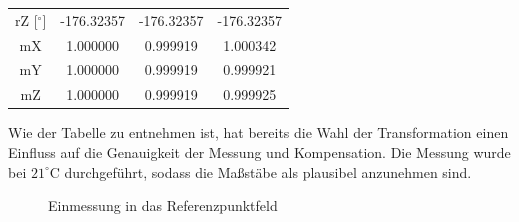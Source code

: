 \begin{table}[H]
\begin{tabular}{cccc}
\multicolumn{1}{c|}{rZ [$^\circ$]} &
\multicolumn{1}{c|}{-176.32357} &
\multicolumn{1}{c|}{-176.32357} &
\multicolumn{1}{c}{-176.32357} \\

\multicolumn{1}{c|}{mX} &
\multicolumn{1}{c|}{1.000000} &
\multicolumn{1}{c|}{0.999919} &
\multicolumn{1}{c}{1.000342} \\

\multicolumn{1}{c|}{mY} &
\multicolumn{1}{c|}{1.000000} &
\multicolumn{1}{c|}{0.999919} &
\multicolumn{1}{c}{0.999921} \\

\multicolumn{1}{c|}{mZ} &
\multicolumn{1}{c|}{1.000000} &
\multicolumn{1}{c|}{0.999919} &
\multicolumn{1}{c}{0.999925} \\
\bottomrule

\end{tabular}
\end{table}

Wie der Tabelle zu entnehmen ist, hat bereits die Wahl der Transformation einen Einfluss auf die Genauigkeit der Messung und Kompensation. Die Messung wurde bei $21^\circ\text{C}$ durchgeführt, sodass die Maßstäbe als plausibel anzunehmen sind.\\

\begin{figure}[h]
	\label{fig:wandmessung}
	\centering
	\caption{Einmessung in das Referenzpunktfeld}
\end{figure}

